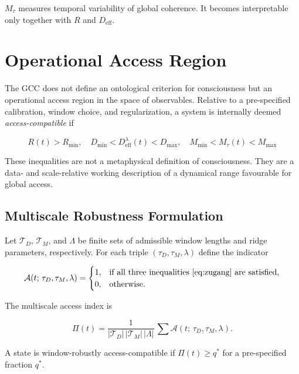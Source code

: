 \documentclass[11pt,a4paper]{article}
\theoremstyle{plain}
\theoremstyle{definition}
\theoremstyle{remark}
\newcommand{\Deff}{D_{\mathrm{eff}}}
\newcommand{\Mtau}{M_{\tau}}
\newcommand{\Rmin}{R_{\min}}
\newcommand{\Dmin}{D_{\min}}
\newcommand{\Dmax}{D_{\max}}
\newcommand{\Mmin}{M_{\min}}
\newcommand{\Mmax}{M_{\max}}
\begin{document}
$\Mtau$ measures temporal variability of global coherence. It becomes interpretable only together with $R$ and $\Deff$.


\section{Operational Access Region}
\label{sec:access-region}
\label{sec:zugang}

The GCC does not define an ontological criterion for consciousness but an operational access region in the space of observables. Relative to a pre-specified calibration, window choice, and regularization, a system is internally deemed \emph{access-compatible} if

\begin{equation}
\label{eq:zugang}
\boxed{\;
R(t) > \Rmin, \quad
\Dmin < \Deff^{\lambda}(t) < \Dmax, \quad
\Mmin < \Mtau(t) < \Mmax
\;}
\end{equation}

These inequalities are not a metaphysical definition of consciousness. They are a data- and scale-relative working description of a dynamical range favourable for global access.

\subsection{Multiscale Robustness Formulation}

Let $\mathcal{T}_D$, $\mathcal{T}_M$, and $\Lambda$ be finite sets of admissible window lengths and ridge parameters, respectively. For each triple $(\tau_D, \tau_M, \lambda)$ define the indicator

\begin{equation}
\mathcal{A}(t;\,\tau_D,\tau_M,\lambda) =
\begin{cases}
1, & \text{if all three inequalities~\eqref{eq:zugang} are satisfied,}\\
0, & \text{otherwise.}
\end{cases}
\end{equation}

The multiscale access index is

\begin{equation}
\label{eq:Pi}
\Pi(t) = \frac{1}{|\mathcal{T}_D|\,|\mathcal{T}_M|\,|\Lambda|}\,\sum \mathcal{A}(t;\,\tau_D,\tau_M,\lambda).
\end{equation}

A state is window-robustly access-compatible if $\Pi(t) \geq q^*$ for a pre-specified fraction $q^*$.
\end{document}
